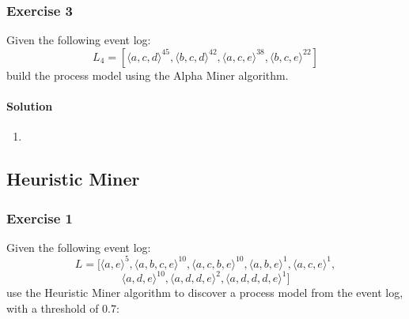\subsubsection{Exercise 3}
Given the following event log:
\[L_4 = [\langle a,c,d \rangle^45, \langle b,c,d \rangle^42, \langle a,c,e \rangle^38, \langle b,c,e \rangle^22]\]
build the process model using the Alpha Miner algorithm.
\paragraph{Solution}
\begin{enumerate}
    \item 
\end{enumerate}

\subsection{Heuristic Miner}
\subsubsection{Exercise 1}
Given the following event log:
\[L = [\langle a,e \rangle^5, \langle a,b,c,e \rangle^10, \langle a,c,b,e \rangle^10, \langle a,b,e \rangle^1, \langle a,c,e \rangle^1,\]
\[
\langle a,d,e \rangle^10, \langle a,d,d,e \rangle^2, \langle a,d,d,d,e \rangle^1]
\]
use the Heuristic Miner algorithm to discover a process model from the event log, with a threshold of 0.7:
